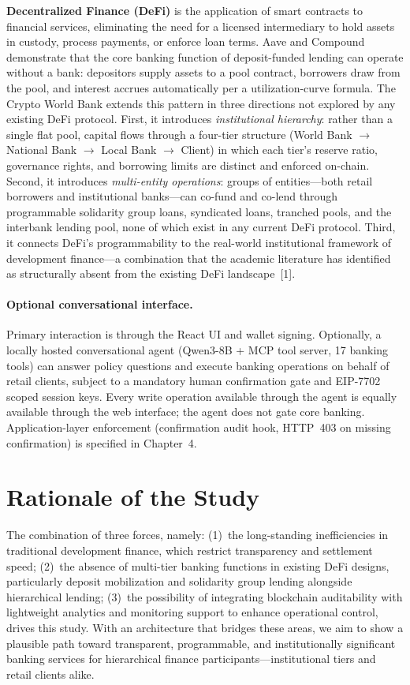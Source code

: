 \documentclass[12pt,a4paper]{report}
\begin{document}
\textbf{Decentralized Finance (DeFi)} is the application of smart contracts to financial services, eliminating the need for a licensed intermediary to hold assets in custody, process payments, or enforce loan terms. Aave and Compound demonstrate that the core banking function of deposit-funded lending can operate without a bank: depositors supply assets to a pool contract, borrowers draw from the pool, and interest accrues automatically per a utilization-curve formula. The Crypto World Bank extends this pattern in three directions not explored by any existing DeFi protocol. First, it introduces \textit{institutional hierarchy}: rather than a single flat pool, capital flows through a four-tier structure (World Bank $\to$ National Bank $\to$ Local Bank $\to$ Client) in which each tier's reserve ratio, governance rights, and borrowing limits are distinct and enforced on-chain. Second, it introduces \textit{multi-entity operations}: groups of entities---both retail borrowers and institutional banks---can co-fund and co-lend through programmable solidarity group loans, syndicated loans, tranched pools, and the interbank lending pool, none of which exist in any current DeFi protocol. Third, it connects DeFi's programmability to the real-world institutional framework of development finance---a combination that the academic literature has identified as structurally absent from the existing DeFi landscape~[1].

\paragraph{Optional conversational interface.}
Primary interaction is through the React UI and wallet signing. Optionally, a locally hosted conversational agent (Qwen3-8B + MCP tool server, 17 banking tools) can answer policy questions and execute banking operations on behalf of retail clients, subject to a mandatory human confirmation gate and EIP-7702 scoped session keys. Every write operation available through the agent is equally available through the web interface; the agent does not gate core banking. Application-layer enforcement (confirmation audit hook, HTTP~403 on missing confirmation) is specified in Chapter~4.

\section{Rationale of the Study}

The combination of three forces, namely: (1)~the long-standing inefficiencies in traditional development finance, which restrict transparency and settlement speed; (2)~the absence of multi-tier banking functions in existing DeFi designs, particularly deposit mobilization and solidarity group lending alongside hierarchical lending; (3)~the possibility of integrating blockchain auditability with lightweight analytics and monitoring support to enhance operational control, drives this study. With an architecture that bridges these areas, we aim to show a plausible path toward transparent, programmable, and institutionally significant banking services for hierarchical finance participants---institutional tiers and retail clients alike.
\end{document}
